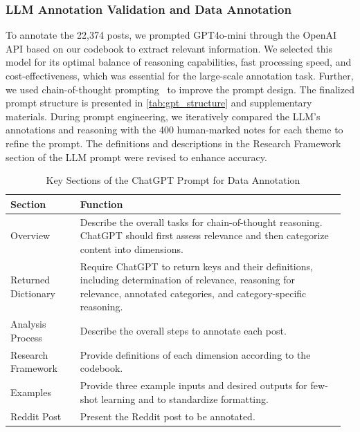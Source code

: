 \documentclass[sigconf, nonacm]{acmart}
\begin{document}
\subsubsection{LLM Annotation Validation and Data Annotation}
To annotate the 22,374 posts, we prompted GPT4o-mini through the OpenAI API based on our codebook to extract relevant information. We selected this model for its optimal balance of reasoning capabilities, fast processing speed, and cost-effectiveness, which was essential for the large-scale annotation task. Further, we used chain-of-thought prompting~\cite{wei2022chain} to improve the prompt design. The finalized prompt structure is presented in \autoref{tab:gpt_structure} and supplementary materials. During prompt engineering, we iteratively compared the LLM's annotations and reasoning with the 400 human-marked notes for each theme to refine the prompt. The definitions and descriptions in the Research Framework section of the LLM prompt were revised to enhance accuracy.

\begin{table}[!h]
    \centering
    \footnotesize
    \begin{tabular}{p{0.2\linewidth}|p{0.76\linewidth}}
    \toprule
        Section & Function \\
    \toprule
        Overview & Describe the overall tasks for chain-of-thought reasoning. ChatGPT should first assess relevance and then categorize content into dimensions. \\
    \hline
        Returned Dictionary & Require ChatGPT to return keys and their definitions, including determination of relevance, reasoning for relevance, annotated categories, and category-specific reasoning. \\
    \hline
        Analysis Process & Describe the overall steps to annotate each post. \\
    \hline
        Research Framework & Provide definitions of each dimension according to the codebook. \\
    \hline
        Examples & Provide three example inputs and desired outputs for few-shot learning and to standardize formatting. \\
    \hline
        Reddit Post & Present the Reddit post to be annotated. \\
    \hline
    \end{tabular}
    \caption{Key Sections of the ChatGPT Prompt for Data Annotation}
    \label{tab:gpt_structure}
\end{table}
\end{document}
